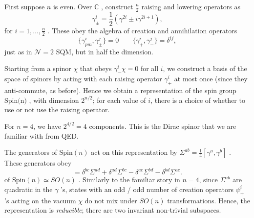 First suppose $n$  is even. Over $\mathbb{C}$ , construct $\frac{n}{2}$  raising and lowering operators as
\begin{equation}
  \gamma^{i}_{\pm} = \frac{1}{2} \left( \gamma^{2i} \pm i \gamma^{2i + 1} \right),
\end{equation}
for $i = 1, \dots, \frac{n}{2}$ .
These obey the algebra of creation and annihilation operators
\begin{equation}
  \{ \gamma^i_{pm}, \gamma^j_{\pm} \} = 0 \qquad \{\gamma^i_+, \gamma^j_-\} = \delta^{ij},
\end{equation}
just as in $\mathscr{N} = 2$ SQM, but in half the dimension.

Starting from a spinor $\chi$ that obeys $\gamma^{i}_- \chi = 0$  for all $i$, we construct a basis of the space of spinors by acting with each raising operator  $\gamma^{i}_+$  at most once (since they anti-commute, as before).
Hence we obtain a representation of the spin group $\text{Spin(n)}$ , with dimension $2^{n / 2}$; for each value of $i$, there is a choice of whether to use or not use the raising operator.
\begin{example}[]
  For $n = 4$, we have $2^{4 / 2} = 4 $ components. This is the Dirac spinor that we are familiar with from QED.
\end{example}

The generators of $\text{Spin}(n)$  act on this representation by $\Sigma^{ab} = \frac{1}{4} [\gamma^a, \gamma^b]$ .
These generators obey
\begin{equation}
  [\Sigma^{ab}, \Sigma^{cd}] = \delta^{bc} \Sigma^{ad} + \delta^{ad} \Sigma^{bc} - \delta^{ac} \Sigma^{bd} - \delta^{bd} \Sigma^{ac}.
\end{equation}
of $\text{Spin}(n) \simeq SO(n)$ .
Similarly to the familiar story in $n = 4$, since  $\Sigma^{ab}$  are quadratic in the $\gamma$ 's, states with an odd / odd number of creation operators $\psi^{i}_+$ 's acting on the vacuum $\chi$ do not mix under $SO(n)$  transformations.
Hence, the representation is \emph{reducible}; there are two invariant non-trivial subspaces.

